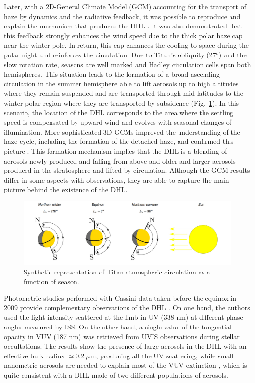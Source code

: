 Later, with a 2D-General Climate Model (GCM) accounting for the transport of haze by dynamics and the radiative
feedback, it was possible to reproduce and explain the mechanism that produces the DHL \citep{Rannou2002}. It was also
demonstrated that this feedback strongly enhances the wind speed due to the thick polar haze cap near the winter pole.
In return, this cap enhances the cooling to space during the polar night \citep{Rannou2004} and
reinforces the circulation. Due to Titan's obliquity (\ang{27}) and the slow rotation rate, seasons are well
marked and Hadley circulation cells span both hemispheres. This situation leads to the formation of a
broad ascending circulation in the summer hemisphere able to lift aerosols up to high altitudes where they remain
suspended and are transported through mid-latitudes to the winter polar region where they are transported by
subsidence (Fig.~\ref{fig:titan_atm_circulation}). In this scenario, the location of the DHL corresponds to the area
where the settling speed is compensated by upward wind and evolves with seasonal changes of illumination.
More sophisticated 3D-GCMs improved the understanding of the haze cycle, including the formation of the detached haze,
and confirmed this picture \citep{Lebonnois2012,Larson2015}. This formation mechanism implies that the DHL
is a blending of aerosols newly produced and falling from above and older and larger aerosols produced in the
stratosphere and lifted by circulation.
Although the GCM results differ in some aspects with observations, they are able to capture the main picture behind
the existence of the DHL.

\begin{figure}[!ht]
    \centering
    \includegraphics[width=\textwidth]{Fig/Atmsopheric_circulation.jpg}  %
    \caption{Synthetic representation of Titan atmospheric circulation as a function of season.}
    \label{fig:titan_atm_circulation}
\end{figure}

Photometric studies performed with Cassini data taken before the equinox in 2009 provide complementary observations
of the DHL \citep{Cours2011, Koskinen2011, Seignovert2017}.
On one hand, the authors used the light intensity scattered at the limb in UV (338 nm)
at different phase angles measured by ISS. On the other hand, a single value of the tangential opacity in VUV (187 nm)
was retrieved from UVIS observations during stellar occultations.
The results show the presence of large aerosols in the DHL with an effective bulk radius $\simeq 0.2\ \mu$m,
producing all the UV scattering, while small nanometric aerosols are needed to explain most of the VUV
extinction \citep{Cours2011}, which is quite consistent with a DHL made of two different populations of
aerosols.

